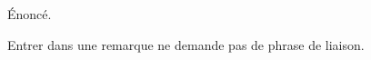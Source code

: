 \begin{theorem}
  Énoncé.
\end{theorem}

\begin{remark}
  Entrer dans une remarque ne demande pas de phrase de liaison.
\end{remark}
